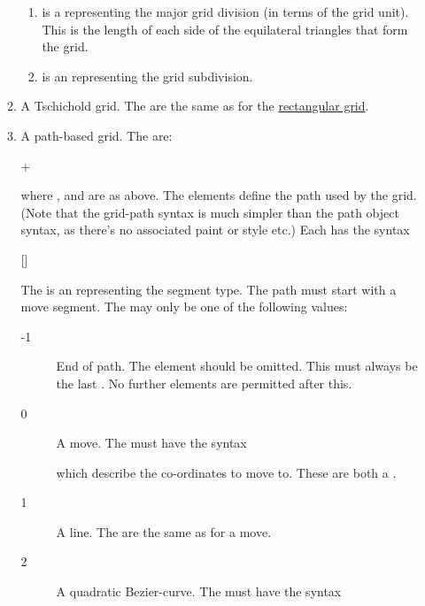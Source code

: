 \begin{numbered}
\begin{enumerate}
\begin{enumerate}
\begin{enumerate}
       \item {} is a  representing the major
        grid division (in terms of the grid unit). This is the
length of each side of the equilateral triangles that form the grid.

       \item {} is an  representing the grid subdivision.
      \end{enumerate}
 
    \item A Tschichold grid. The
      are the same as for the 
     \hyperref[jdr:rectgrid]{rectangular grid}.

    \item A path-based grid. The  are:
     \begin{syntaxline}
        +
     \end{syntaxline}
     where ,  and  are as above. The
      elements define the path used by the grid.
     (Note that the grid-path syntax is much simpler than the
     \gls{path} object syntax, as there's no associated paint or
     style etc.) Each  has the syntax
     \begin{syntaxline}
      []
     \end{syntaxline}
    The  is an  representing the
     segment type. The path must start with a move segment. The
      may only be one of the following values:
     \begin{description}
      \item[-1] End of path. The  element should be
       omitted. This must always be the last .
       No further  elements are
       permitted after this.
      \item[0] A move. The  must have the syntax
      \begin{syntaxline}
        
      \end{syntaxline}
      which describe the co-ordinates to move to. These are both a
      .
      \item[1] A line. The  are the same as for
      a move.
      \item[2] A quadratic \gls{Bezier-curve}. The  must have
       the syntax
      \begin{syntaxline}

\end{syntaxline}
\end{description}
\end{enumerate}
\end{enumerate}
\end{numbered}
